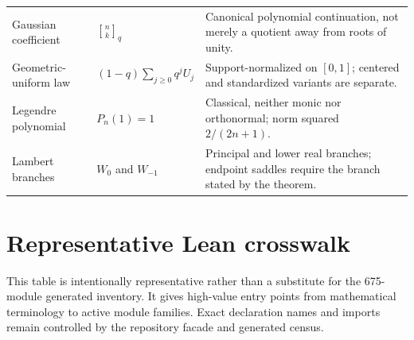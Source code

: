 \documentclass[11pt,oneside]{article}
\newcommand{\qbinom}[3]{\genfrac{[}{]}{0pt}{}{#1}{#2}_{#3}}
\begin{document}
\begin{longtable}{@{}L{0.22\textwidth}L{0.29\textwidth}L{0.43\textwidth}@{}}
Gaussian coefficient & \(\qbinom{n}{k}{q}\) & Canonical polynomial continuation, not merely a quotient away from roots of unity. \\
Geometric-uniform law & \((1-q)\sum_{j\ge0}q^jU_j\) & Support-normalized on \([0,1]\); centered and standardized variants are separate. \\
Legendre polynomial & \(P_n(1)=1\) & Classical, neither monic nor orthonormal; norm squared \(2/(2n+1)\). \\
Lambert branches & \(W_0\) and \(W_{-1}\) & Principal and lower real branches; endpoint saddles require the branch stated by the theorem. \\
\bottomrule\end{longtable}\endgroup
\section{Representative Lean crosswalk}
This table is intentionally representative rather than a substitute for the
675-module generated inventory.  It gives high-value entry points from
mathematical terminology to active module families.  Exact declaration names
and imports remain controlled by the repository facade and generated census.
\begingroup\footnotesize\renewcommand{\arraystretch}{1.12}
\end{document}
